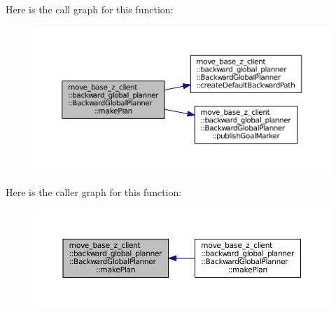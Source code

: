 Here is the call graph for this function\+:
\nopagebreak
\begin{figure}[H]
\begin{center}
\leavevmode
\includegraphics[width=350pt]{classmove__base__z__client_1_1backward__global__planner_1_1BackwardGlobalPlanner_af9441c1bd8d258281458ca7fa012e0e6_cgraph}
\end{center}
\end{figure}




Here is the caller graph for this function\+:
\nopagebreak
\begin{figure}[H]
\begin{center}
\leavevmode
\includegraphics[width=350pt]{classmove__base__z__client_1_1backward__global__planner_1_1BackwardGlobalPlanner_af9441c1bd8d258281458ca7fa012e0e6_icgraph}
\end{center}
\end{figure}


